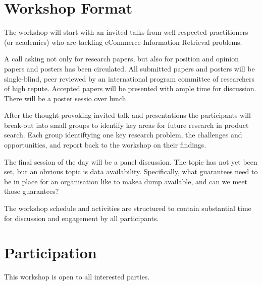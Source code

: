 \documentclass[sigconf]{acmart}
\begin{document}
\section{Workshop Format}

The workshop will start with an invited talks from  well respected
practitioners (or academics) who are tackling eCommerce Information Retrieval problems.

A call asking not only for research papers, but also for position and opinion papers and posters
has been circulated.  All submitted papers and posters will be single-blind, peer reviewed by an
international program committee of researchers of high repute.  Accepted
papers will be presented with ample time for discussion.  There will be a poster sessio over lunch.

After the thought provoking invited talk and presentations the participants
will break-out into small groups to identify key areas for future
research in product search. Each group identiftying one key research
problem, the challenges and opportunities, and report back to the
workshop on their findings.

The final session of the day will be a panel discussion.  The topic has
not yet been set, but an obvious topic is data availability.
Specifically, what guarantees need to be in place for an organisation
like to makea dump available, and can we meet those guarantees?

The workshop schedule and activities are structured to contain
substantial time for discussion and engagement by all participants.

\section{Participation}
This workshop is open to all interested parties.
\end{document}
